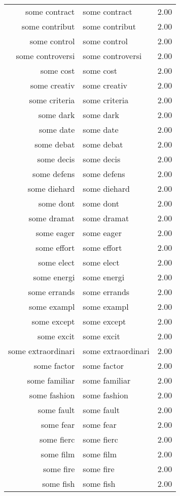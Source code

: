 \begin{table}[ht]
\begin{tabular}{rlr}
  some contract & some contract & 2.00 \\ 
  some contribut & some contribut & 2.00 \\ 
  some control & some control & 2.00 \\ 
  some controversi & some controversi & 2.00 \\ 
  some cost & some cost & 2.00 \\ 
  some creativ & some creativ & 2.00 \\ 
  some criteria & some criteria & 2.00 \\ 
  some dark & some dark & 2.00 \\ 
  some date & some date & 2.00 \\ 
  some debat & some debat & 2.00 \\ 
  some decis & some decis & 2.00 \\ 
  some defens & some defens & 2.00 \\ 
  some diehard & some diehard & 2.00 \\ 
  some dont & some dont & 2.00 \\ 
  some dramat & some dramat & 2.00 \\ 
  some eager & some eager & 2.00 \\ 
  some effort & some effort & 2.00 \\ 
  some elect & some elect & 2.00 \\ 
  some energi & some energi & 2.00 \\ 
  some errands & some errands & 2.00 \\ 
  some exampl & some exampl & 2.00 \\ 
  some except & some except & 2.00 \\ 
  some excit & some excit & 2.00 \\ 
  some extraordinari & some extraordinari & 2.00 \\ 
  some factor & some factor & 2.00 \\ 
  some familiar & some familiar & 2.00 \\ 
  some fashion & some fashion & 2.00 \\ 
  some fault & some fault & 2.00 \\ 
  some fear & some fear & 2.00 \\ 
  some fierc & some fierc & 2.00 \\ 
  some film & some film & 2.00 \\ 
  some fire & some fire & 2.00 \\ 
  some fish & some fish & 2.00 \\ 

\end{tabular}
\end{table}
